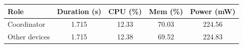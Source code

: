 \begin{tabular}{lcccc}
\hline
\textbf{Role} & \textbf{Duration (s)} & \textbf{CPU (\%)} & \textbf{Mem (\%)} & \textbf{Power (mW)} \\
\hline
Coordinator & 1.715 & 12.33 & 70.03 & 224.56 \\
Other devices & 1.715 & 12.38 & 69.52 & 224.83 \\
\hline
\end{tabular}
